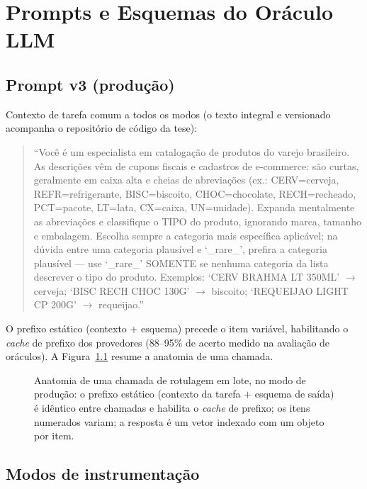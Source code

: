 \chapter{Prompts e Esquemas do Oráculo LLM}
\label{ap:prompts}

\section{Prompt v3 (produção)}

Contexto de tarefa comum a todos os modos (o texto integral e versionado
acompanha o repositório de código da tese):

\begin{quote}\small\sloppy
``Você é um especialista em catalogação de produtos do varejo brasileiro. As
descrições vêm de cupons fiscais e cadastros de e-commerce: são curtas,
geralmente em caixa alta e cheias de abreviações (ex.: CERV=cerveja,
REFR=refrigerante, BISC=biscoito, CHOC=chocolate, RECH=recheado, PCT=pacote,
LT=lata, CX=caixa, UN=unidade). Expanda mentalmente as abreviações e
classifique o TIPO do produto, ignorando marca, tamanho e embalagem. Escolha
sempre a categoria mais específica aplicável; na dúvida entre uma categoria
plausível e `\_rare\_', prefira a categoria plausível — use `\_rare\_' SOMENTE
se nenhuma categoria da lista descrever o tipo do produto. Exemplos:
`CERV BRAHMA LT 350ML' $\to$ cerveja; `BISC RECH CHOC 130G' $\to$ biscoito;
`REQUEIJAO LIGHT CP 200G' $\to$ requeijao.''
\end{quote}

O prefixo estático (contexto + esquema) precede o item variável, habilitando
o \textit{cache} de prefixo dos provedores (88--95\% de acerto medido na
avaliação de oráculos). A Figura~\ref{fig:ap-prompts-anatomia} resume a
anatomia de uma chamada.

\begin{figure}[htbp]
    \centering
    
    \caption{Anatomia de uma chamada de rotulagem em lote, no modo de
    produção: o prefixo estático (contexto da tarefa $+$ esquema de saída)
    é idêntico entre chamadas e habilita o \textit{cache} de prefixo; os
    itens numerados variam; a resposta é um vetor indexado com um objeto
    por item.}
    \label{fig:ap-prompts-anatomia}
\end{figure}

\section{Modos de instrumentação}

